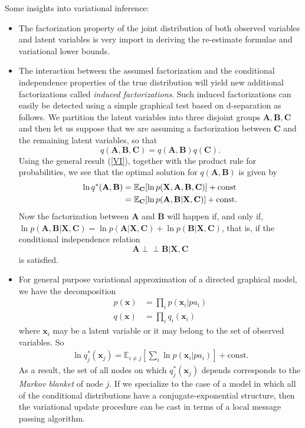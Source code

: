 \documentclass[a4paper]{book}
\def\ci{\perp\!\!\!\perp}
\newcommand{\up}{\mathrm}
\renewcommand{\bf}{\mathbf}
\newcommand{\bb}{\mathbb}
\newcommand{\imp}[1]{\textit{#1}}
\begin{document}
Some insights into variational inference:
\begin{itemize}
	\item The factorization property of the joint distribution of both observed variables and latent variables is very import in deriving the re-estimate formulae and variational lower bounds.
	\item The interaction between the assumed factorization and the conditional independence properties of the true distribution will yield new additional factorizations called \imp{induced factorizations}. Such induced factorizations can easily be detected using a simple graphical test based on d-separation as follows. We partition the latent variables into three disjoint groups $\bf{A,B,C}$ and then let us suppose that we are assuming a factorization between $\bf{C}$ and the remaining latent variables, so that
	\begin{equation}
		q(\bf{A,B,C}) = q(\bf{A,B}) q(\bf{C}).
	\end{equation}
	Using the general result (\ref{VI}), together with the product rule for probabilities, we see that the optimal solution for $q(\bf{A,B})$ is given by
	\begin{align}
		\ln q^*(\bf{A,B}) &= \bb{E}_{\bf{C}}[\ln p(\bf{X,A,B,C})] + \up{const} \notag \\
		&= \bb{E}_{\bf{C}}[\ln p(\bf{A,B|X,C})] + \up{const}.
	\end{align}
	Now the factorization between $\bf{A}$ and $\bf{B}$ will happen if, and only if, $\ln p(\bf{A,B|X,C}) = \ln p(\bf{A|X,C})+\ln p(\bf{B|X,C})$, that is, if the conditional independence relation
	\begin{equation}
		\bf{A \ci B|X,C}
	\end{equation}
	is satisfied. 
	\item For general purpose variational approximation of a directed graphical model, we have the decomposition
	\begin{align}
		p(\bf{x}) &= \prod_i p(\bf{x}_i|pa_i) \\
		q(\bf{x}) &= \prod_i q_i(\bf{x}_i)
	\end{align}
	where $\bf{x}_i$ may be a latent variable or it may belong to the set of observed variables.
	So
	\begin{align}
		\ln q_j^*(\bf{x}_j) = \bb{E}_{i \neq j}\left[ \sum_i \ln p(\bf{x}_i|pa_i) \right] + \up{const}.
	\end{align}
	As a result, the set of all nodes on which $q_j^*(\bf{x}_j)$ depends corresponds to the \imp{Markov blanket} of node $j$. If we specialize to the case of a model in which all of the conditional distributions have a conjugate-exponential structure, then the variational update procedure can be cast in terms of a local message passing algorithm.	
\end{itemize}
\end{document}

